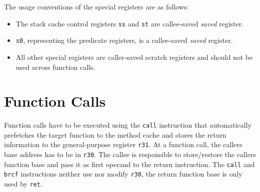 \documentclass[a4paper,fontsize=10pt,twoside,DIV15,BCOR12mm,headinclude=true,footinclude=false,pagesize,bibtotoc]{scrbook}
\newcommand{\comment}[3]{

\textsf{\textbf{#1}} {\color{#3}#2}}
\newcommand{\stefan}[1]{\comment{Stefan}{#1}{RoyalPurple}}
\newcommand{\daniel}[1]{\comment{Daniel}{#1}{RoyalBlue}}
\newcommand{\fb}[1]{\comment{Florian}{#1}{Emerald}}
\renewcommand{\stefan}[1]{}
\renewcommand{\daniel}[1]{}
\renewcommand{\fb}[1]{}
\begin{document}
\daniel{
What I'd like to have for single-path code is a guard predicate parameter for the called function, e.g., always passed in p1.
}
\fb{What would the guard predicate be good for? If need be we could define a
separate calling convention for single-path-programming programs; in order to
keep the conventions for the other programs sane.}

\stefan{We would gain in most cases by making predicates caller-saved, since predicates are usually not
used across function calls, this saves up to 6 instructions per call.
Predicate live ranges over calls only happen with single-path and if-conversion. However, having only caller-saved predicates
makes if-conversion of calls too costly (and too complex). A nicer solution would be to have p1-p4 caller-saved and
p5-p7 callee saved. I got this to work (do not alias s0 with p1-p7 in RegInfo.td, mark s0 and p5-p7 as callee saved
in RegInfo.cpp, and in processBeforeCalleeSavedScan set s0 as used when any of p5-p7 is used), but this would require the
if-converter to use callee-saved predicates when converting calls, i.e., to change the predicate of the condition.
Sounds easy, but is actually far from trivial to hack into the if-converter, and only works if the if-converter runs before the
prologue-inserter, so we stay with callee saved registers for now and live with the costs of spilling s0 at nearly every call.}


The usage conventions of the special registers are as follows:
\begin{itemize}
  \item The stack cache control registers \texttt{ss} and \texttt{st} are callee-saved
        \emph{saved} register.
  \item \texttt{s0}, representing the predicate registers, is a callee-saved \emph{saved} register.
  \item All other special registers are caller-saved scratch registers and should not be used
        across function calls.
\end{itemize}

\section{Function Calls}
\label{sec:function_calls}

Function calls have to be executed using the \texttt{call}
instruction that automatically prefetches the target function to the method
cache and stores the return information to the general-purpose register \texttt{r31}.
At a function call, the callers base address has to be in \texttt{r30}.
The callee is responsible to store/restore the callers function base and pass it as first
operand to the return instruction.
The \texttt{call} and \texttt{brcf} instructions neither use nor modify \texttt{r30}, the
return function base is only used by \texttt{ret}.
\end{document}

